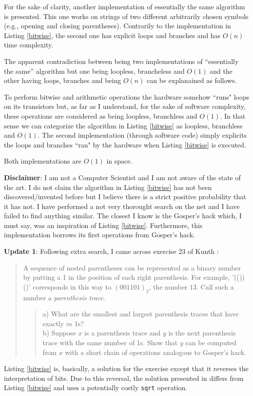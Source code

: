 \documentclass[a4paper]{article}
\begin{document}
For the sake of clarity, another implementation of essentially the same algorithm is presented.
This one works on strings of two different arbitrarily chosen symbols (e.g., opening and closing parentheses).
Contrarily to the implementation in Listing \ref{bitwise}, the second one has explicit loops and branches and has $O(n)$ time complexity.

The apparent contradiction between being two implementations of ``essentially the same'' algorithm but one being loopless, brancheless and $O(1)$ and the other having loops, branches and being $O(n)$ can be explanained as follows.

To perform bitwise and arithmetic operations the hardware somehow ``runs" loops on its transistors but, as far as I understand, for the sake of software complexity, these operations are considered as being loopless, branchless and $O(1)$.
In that sense we can categorize the algorithm in Listing \ref{bitwise} as loopless, branchless and $O(1)$.
The second implementation (through software code) simply explicits the loops and branches ``ran" by the hardware when Listing \ref{bitwise} is executed.

Both implementations are $O(1)$ in space.

{\bf Disclaimer}: I am not a Computer Scientist and I am not aware of the state of the art.
I do not claim the algorithm in Listing \ref{bitwise} has not been discovered/invented before but I believe there is a strict positive probability that it has not.
I have performed a not very thorought search on the net and I have failed to find anything similar.
The closest I know is the Gosper's hack \cite{Wikipedia-Combinatorial} which, I must say, was an inspiration of Listing \ref{bitwise}.
Furthermore, this implementation borrows its first operations from Gosper's hack.

{\bf Update 1}: Following extra search, I came across exercise 23 of Kunth \cite{Knuth}:

\begin{quote}
A sequence of nested parentheses can be represented as a binary number by putting a 1 in the position of each right parenthesis.
For example, '(())()' corresponds in this way to $(001101)_2$, the number $13$.
Call such a number a {\em parenthesis trace}.
\begin{quote}
a) What are the smallest and largest parenthesis traces that have exactly $m$ 1s? \\
b) Suppose $x$ is a parenthesis trace and $y$ is the next parenthesis trace with the same number of 1s.
Show that $y$ can be computed from $x$ with a short chain of operations analogous to Gosper's hack.
\end{quote}
\end{quote}
Listing \ref{bitwise} is, basically, a solution for the exercise except that it reverses the interpretation of bits.
Due to this reversal, the solution presented in \cite{Knuth} differs from Listing \ref{bitwise} and uses a potentially costly \verb!sqrt! operation.
\end{document}
